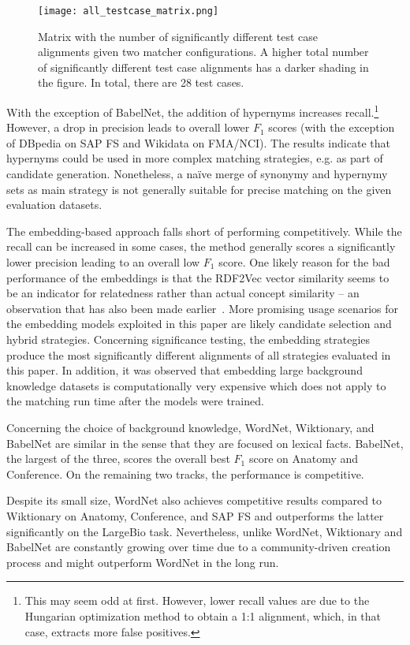 \documentclass[runningheads]{llncs}
\begin{document}
\begin{figure}[h]
    \centering
    \texttt{[image: all\_testcase\_matrix.png]}
    \caption{Matrix with the number of significantly different test case alignments given two matcher configurations. A higher total number of significantly different test case alignments has a darker shading in the figure. In total, there are 28 test cases.}
    \label{fig:all_syn_tc_significance}
\end{figure}


With the exception of BabelNet, the addition of hypernyms increases recall.\footnote{This may seem odd at first. However, lower recall values are due to the Hungarian optimization method to obtain a 1:1 alignment, which, in that case, extracts more false positives.} However, a drop in precision leads to overall lower $F_1$ scores (with the exception of DBpedia on SAP FS and Wikidata on FMA/NCI). The results indicate that hypernyms could be used in more complex matching strategies, e.g. as part of candidate generation. Nonetheless, a na\"{i}ve merge of synonymy and hypernymy sets as main strategy is not generally suitable for precise matching on the given evaluation datasets.

The embedding-based approach falls short of performing competitively. While the recall can be increased in some cases, the method generally scores a significantly lower precision leading to an overall low $F_1$ score.
One likely reason for the bad performance of the embeddings is that the RDF2Vec vector similarity seems to be an indicator for relatedness rather than actual concept similarity -- an observation that has also been made earlier~\cite{kgvec2go}. More promising usage scenarios for the embedding models exploited in this paper are likely candidate selection and hybrid strategies. Concerning significance testing, the embedding strategies produce the most significantly different alignments of all strategies evaluated in this paper. 
In addition, it was observed that embedding large background knowledge datasets is computationally very expensive which does not apply to the matching run time after the models were trained. 

Concerning the choice of background knowledge, WordNet, Wiktionary, and BabelNet are similar in the sense that they are focused on lexical facts. BabelNet, the largest of the three, scores the overall best $F_1$ score on Anatomy and Conference. On the remaining two tracks, the performance is competitive.

Despite its small size, WordNet also achieves competitive results compared to Wiktionary on Anatomy, Conference, and SAP FS and outperforms the latter significantly on the LargeBio task. Nevertheless, unlike WordNet, Wiktionary and BabelNet are constantly growing over time due to a community-driven creation process and might outperform WordNet in the long run.
\end{document}
